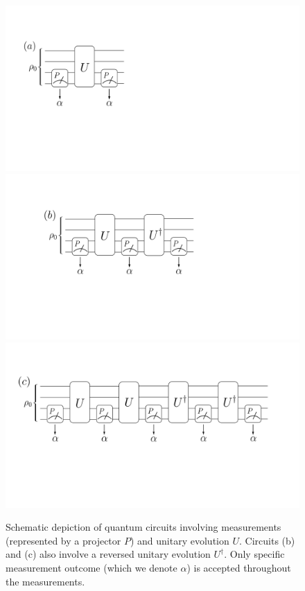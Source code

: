 \documentclass[%
 reprint,
 superscriptaddress,
 amsmath,amssymb,
prx,
]{revtex4-2}\href{\href{}{}}{}
\begin{document}
\begin{figure}[t]
	\includegraphics[height = 0.3\columnwidth]{setup_circuit_PUP.pdf}\qquad\quad
    \includegraphics[height = 0.3\columnwidth]{setup_circuit_PUPUdagP.pdf}\\
    \vspace{0.15cm}
    \includegraphics[height = 0.3\columnwidth]{setup_circuit_PUPUP.pdf}
	\caption{Schematic depiction of quantum circuits involving measurements (represented by a projector $P$) and unitary evolution $U$. Circuits (b) and (c) also involve a reversed unitary evolution $U^{\dag}$. Only specific measurement outcome (which we denote $\alpha$) is accepted throughout the measurements.}
	\label{fig:circuit}
\end{figure}
\end{document}
